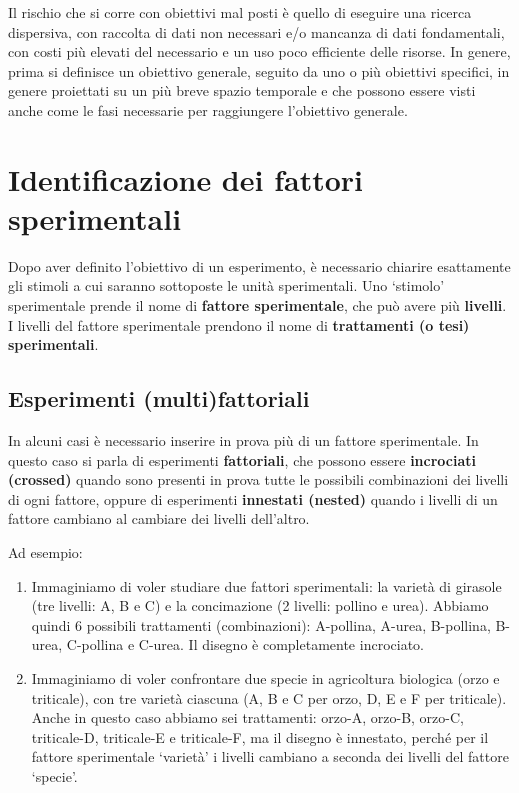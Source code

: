 \documentclass[a4paper,12pt,oneside]{book}
\providecommand{\tightlist}{%
  \setlength{\itemsep}{0pt}\setlength{\parskip}{0pt}}
\theoremstyle{definition}
\theoremstyle{definition}
\theoremstyle{definition}
\theoremstyle{remark}
\begin{document}
Il rischio che si corre con obiettivi mal posti è quello di eseguire una
ricerca dispersiva, con raccolta di dati non necessari e/o mancanza di
dati fondamentali, con costi più elevati del necessario e un uso poco
efficiente delle risorse. In genere, prima si definisce un obiettivo
generale, seguito da uno o più obiettivi specifici, in genere proiettati
su un più breve spazio temporale e che possono essere visti anche come
le fasi necessarie per raggiungere l'obiettivo generale.

\section{Identificazione dei fattori
sperimentali}\label{identificazione-dei-fattori-sperimentali}

Dopo aver definito l'obiettivo di un esperimento, è necessario chiarire
esattamente gli stimoli a cui saranno sottoposte le unità sperimentali.
Uno `stimolo' sperimentale prende il nome di \textbf{fattore
sperimentale}, che può avere più \textbf{livelli}. I livelli del fattore
sperimentale prendono il nome di \textbf{trattamenti (o tesi)
sperimentali}.

\subsection{Esperimenti
(multi)fattoriali}\label{esperimenti-multifattoriali}

In alcuni casi è necessario inserire in prova più di un fattore
sperimentale. In questo caso si parla di esperimenti
\textbf{fattoriali}, che possono essere \textbf{incrociati (crossed)}
quando sono presenti in prova tutte le possibili combinazioni dei
livelli di ogni fattore, oppure di esperimenti \textbf{innestati
(nested)} quando i livelli di un fattore cambiano al cambiare dei
livelli dell'altro.

Ad esempio:

\begin{enumerate}
\def\labelenumi{\arabic{enumi}.}
\tightlist
\item
  Immaginiamo di voler studiare due fattori sperimentali: la varietà di
  girasole (tre livelli: A, B e C) e la concimazione (2 livelli: pollino
  e urea). Abbiamo quindi 6 possibili trattamenti (combinazioni):
  A-pollina, A-urea, B-pollina, B-urea, C-pollina e C-urea. Il disegno è
  completamente incrociato.
\item
  Immaginiamo di voler confrontare due specie in agricoltura biologica
  (orzo e triticale), con tre varietà ciascuna (A, B e C per orzo, D, E
  e F per triticale). Anche in questo caso abbiamo sei trattamenti:
  orzo-A, orzo-B, orzo-C, triticale-D, triticale-E e triticale-F, ma il
  disegno è innestato, perché per il fattore sperimentale `varietà' i
  livelli cambiano a seconda dei livelli del fattore `specie'.
\end{enumerate}
\end{document}
